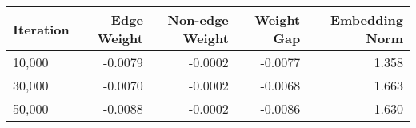 \begin{tabular}{lrrrr}
\toprule
Iteration & Edge Weight & Non-edge Weight & Weight Gap & Embedding Norm \\
\midrule
   10,000 &     -0.0079 &         -0.0002 &    -0.0077 &          1.358 \\
   30,000 &     -0.0070 &         -0.0002 &    -0.0068 &          1.663 \\
   50,000 &     -0.0088 &         -0.0002 &    -0.0086 &          1.630 \\
\bottomrule
\end{tabular}
